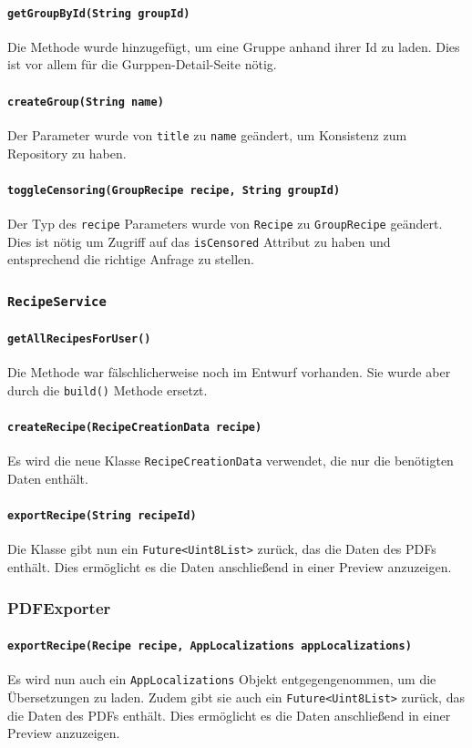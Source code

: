 \documentclass{implementierungsheft}
\begin{document}
\paragraph*{\texttt{getGroupById(String groupId)}}
Die Methode wurde hinzugefügt, um eine Gruppe anhand ihrer Id zu laden. Dies ist vor allem für die Gurppen-Detail-Seite nötig.
\paragraph{\texttt{createGroup(String name)}}
Der Parameter wurde von \texttt{title} zu \texttt{name} geändert, um Konsistenz zum Repository zu haben.
\paragraph{\texttt{toggleCensoring(GroupRecipe recipe, String groupId)}}
Der Typ des \texttt{recipe} Parameters wurde von \texttt{Recipe} zu \texttt{GroupRecipe} geändert. Dies ist nötig um Zugriff auf das \texttt{isCensored} Attribut zu haben und entsprechend die richtige Anfrage zu stellen.
\subsubsection{\texttt{RecipeService}}
\paragraph{\texttt{getAllRecipesForUser()}}
Die Methode war fälschlicherweise noch im Entwurf vorhanden. Sie wurde aber durch die \texttt{build()} Methode ersetzt.
\paragraph{\texttt{createRecipe(RecipeCreationData recipe)}}
Es wird die neue Klasse \texttt{RecipeCreationData} verwendet, die nur die benötigten Daten enthält.
\paragraph{\texttt{exportRecipe(String recipeId)}}
Die Klasse gibt nun ein \texttt{Future<Uint8List>} zurück, das die Daten des PDFs enthält. Dies ermöglicht es die Daten anschließend in einer Preview anzuzeigen.
\subsubsection{PDFExporter}
\paragraph{\texttt{exportRecipe(Recipe recipe, AppLocalizations appLocalizations)}}
Es wird nun auch ein \texttt{AppLocalizations} Objekt entgegengenommen, um die Übersetzungen zu laden. Zudem gibt sie auch ein \texttt{Future<Uint8List>} zurück, das die Daten des PDFs enthält. Dies ermöglicht es die Daten anschließend in einer Preview anzuzeigen.
\newpage
\end{document}
